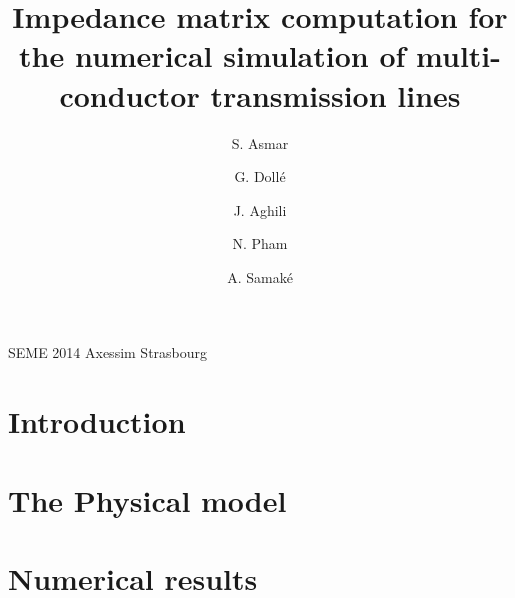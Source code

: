 \documentclass[11pt,a4paper,1p,sort&compress]{elsarticle}
\date{}%
\begin{document}
\begin{frontmatter}


\title{Impedance matrix computation for the numerical simulation of
multi-conductor transmission lines}

\author[ad1]{S. Asmar}
\ead{}
\author[ad2]{G. Dollé}
\author[ad3]{J. Aghili}
\author[ad2]{N. Pham}
\author[ad4]{A. Samaké}
\ead{}

\address[ad1]{Disneyland, Paris}
\address[ad2]{Université de Strasbourg / CNRS, IRMA / UMR  7501. Strasbourg, F-67000, France}
\address[ad3]{Université de Montpellier 2 / 34057 Montpellier Cedex 5, France}
\address[ad4]{Université de Grenoble 1 / CNRS, Laboratoire Jean Kuntzmann / UMR 5224, Grenoble, F-38041, France}


\begin{abstract}
  
\end{abstract}

\begin{keyword}
  SEME 2014 Axessim Strasbourg
\end{keyword}

\end{frontmatter}


\section*{Introduction}
\label{sec:Introdution}


\section*{The Physical model}
\label{sec:Model}


\section*{Numerical results}
\label{sec:Results}

\end{document}
